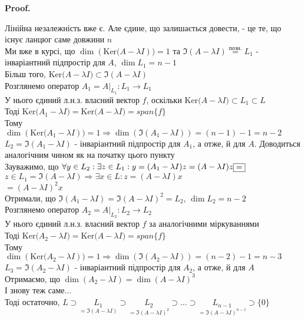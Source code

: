 \documentclass[a4paper, 10pt]{article}
\makeatletter
\def\qed{$\blacksquare$}
\def\ker#1{\textrm{Ker} {#1}}
\theoremstyle{theoremdd}
\theoremstyle{theoremdd}
\theoremstyle{theoremdd}
\theoremstyle{theoremdd}
\theoremstyle{theoremdd}
\theoremstyle{theoremdd}
\theoremstyle{theoremdd}
\theoremstyle{theoremdd}
\renewenvironment{proof}[1][Proof.\\]{\par
\pushQED{\hfill \qed}%
\normalfont \topsep6\p@\@plus6\p@\relax
\trivlist
\item\relax
{\bfseries
#1\@addpunct{.}}\hspace\labelsep\ignorespaces
}{%
\popQED\endtrivlist\@endpefalse
}
\makeatother
\begin{document}
\begin{proof}
Лінійна незалежність вже є. Але єдине, що залишається довести, - це те, що існує ланцюг саме довжини $n$\\
Ми вже в курсі, що $\dim(\ker(A-\lambda I)) = 1$ та $\Im(A-\lambda I) \overset{\textrm{позн.}}{=} L_1$ - інваріантний підпростір для $A$, $\dim L_1 = n-1$\\
Більш того, $\ker(A-\lambda I) \subset \Im(A-\lambda I)$
\bigskip \\
Розглянемо оператор $A_1 = A |_{L_1}: L_1 \to L_1$\\
У нього єдиний л.н.з. власний вектор $f$, оскільки $\ker(A-\lambda I) \subset L_1 \subset L$\\
Тоді $\ker(A_1-\lambda I) = \ker(A-\lambda I) = span\{f\}$\\
Тому $\dim(\ker(A_1 - \lambda I)) = 1 \Rightarrow \dim (\Im(A_1-\lambda I)) = (n-1)-1=n-2$\\
$L_2 = \Im(A_1-\lambda I)$ - інваріантний підпростір для $A_1$, а отже, й для $A$. Доводиться аналогічним чином як на початку цього пункту\\
Зауважимо, що $\forall y \in L_2: \exists z \in L_1: \\ y = (A_1 - \lambda I)z = (A-\lambda I)z \boxed{=}$\\
$z \in L_1 = \Im(A-\lambda I) \Rightarrow \exists x \in L: z = (A-\lambda I)x$\\
$\boxed{=} (A-\lambda I)^2 x$\\
Отримали, що $\Im(A_1 - \lambda I) = \Im(A-\lambda I)^2 = L_2$, $\dim L_2 = n-2$
\bigskip \\
Розглянемо оператор $A_2 = A |_{L_2}: L_2 \to L_2$\\
У нього єдиний л.н.з. власний вектор $f$ за аналогічними міркуваннями\\
Тоді $\ker(A_2-\lambda I) = \ker(A-\lambda I) = span\{f\}$\\
Тому $\dim(\ker(A_2 - \lambda I)) = 1 \Rightarrow \dim (\Im(A_2-\lambda I)) = (n-2)-1=n-3$\\
$L_3 = \Im(A_2-\lambda I)$ - інваріантний підпростір для $A_2$, а отже, й для $A$\\
Отримаємо, що $\dim (A_2 - \lambda I) = \dim (A-\lambda I)^3$\\
І знову теж саме...
\bigskip \\
Тоді остаточно, $L \supset \underset{=\Im(A-\lambda I)}{L_1} \supset \underset{=\Im(A-\lambda I)^2}{L_2} \supset \dots \supset \underset{=\Im(A-\lambda I)^{n-1}}{L_{n-1}} \supset \{0\}$\\

\end{proof}
\end{document}
